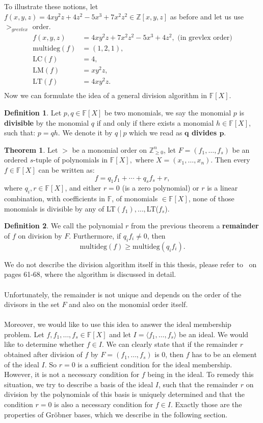 \documentclass[thesis=M,english]{FITthesis}[2012/10/20]
\theoremstyle{remark}
\theoremstyle{definition}
\newtheorem{DF}{Definition}[section]
\newtheorem{theorem}{Theorem}[section]
\begin{document}
\noindent To illustrate these notions, let $f(x,y,z) = 4xy^2z + 4z^2 - 5x^3 + 7x^2z^2 \in \mathbb{Z}[x,y,z]$ as before and let us use $>_{grevlex}$ order.
\begin{align*}
f(x,y,z) &= 4xy^2z + 7x^2z^2  -5x^3 + 4z^2, \text{ (in  grevlex order)}\\
\text{multideg}(f)&=(1,2,1), \\
\text{LC}(f)&=4, \\
\text{LM}(f)&=xy^2z, \\
\text{LT}(f)&=4xy^2z. \\
\end{align*}
Now we can formulate the idea of a general division algorithm in $\mathbb{F}[X]$.
\begin{DF}
Let $p, q \in \mathbb{F}[X]$ be two monomials, we say the monomial $p$ is \textbf{divisible} by the monomial $q$ if and only if there exists a monomial $h \in \mathbb{F}[X]$, such that: $p = qh$. We denote it by $q\ |\ p$ which we read  as \textbf{$\mathbf{q}$ divides $\mathbf{p}$}.
\end{DF}
\begin{theorem}
Let $>$ be a monomial order on $\mathbb{Z}_{\geq 0}^n$, let $F = (f_1, \ldots, f_s)$ be an ordered $s$-tuple of polynomials in $\mathbb{F}[X],$ where $X = (x_1, \ldots, x_n)$. Then every $f \in \mathbb{F}[X]$ can be written as:
$$
f = q_1f_1 + \cdots + q_sf_s + r,
$$
where $q_i, r \in \mathbb{F}[X]$, and either $r = 0$ (is a zero polynomial) or $r$ is a linear combination, with coefficients in $\mathbb{F}$, of monomials $\in \mathbb{F}[X]$, none of those monomials is divisible by any of LT$(f_1), \ldots,$LT($f_s$).
\end{theorem}
\begin{DF}
We call the polynomial $r$ from the previous theorem a \textbf{remainder} of $f$ on division by $F$. Furthermore, if $q_if_i \neq 0$, then
$$
\text{multideg}(f) \geq \text{multideg}(q_if_i).
$$
\end{DF}
\noindent We do not describe the division algorithm itself in this thesis, please refer to~\cite{algGeom} on pages 61-68, where the algorithm is discussed in detail.\\ \\
\noindent Unfortunately, the remainder is not unique and depends on the order of the divisors in the set $F$ and also on the monomial order itself. \\ \\
\noindent Moreover, we would like to use this idea to answer the ideal membership problem. Let $f, f_1, \ldots, f_s \in \mathbb{F}[X]$ and let $I = \langle f_1, \ldots, f_s \rangle$ be an ideal. We would like to determine whether $f \in I$. We can clearly state that if the remainder $r$ obtained after division of $f$ by $F = (f_1, \ldots, f_s)$ is $0$, then $f$ has to be an element of the ideal $I$. So $r=0$ is a sufficient condition for the ideal membership. However, it is not a necessary condition for $f$ being in the ideal. To remedy this situation, we try to describe a  basis of the ideal $I$, such that the remainder $r$ on division by the polynomials of this basis is uniquely determined and that the condition $r=0$ is also a necessary condition for $f \in I$. Exactly those are the properties of Gröbner bases, which we describe in the following section.
\end{document}
